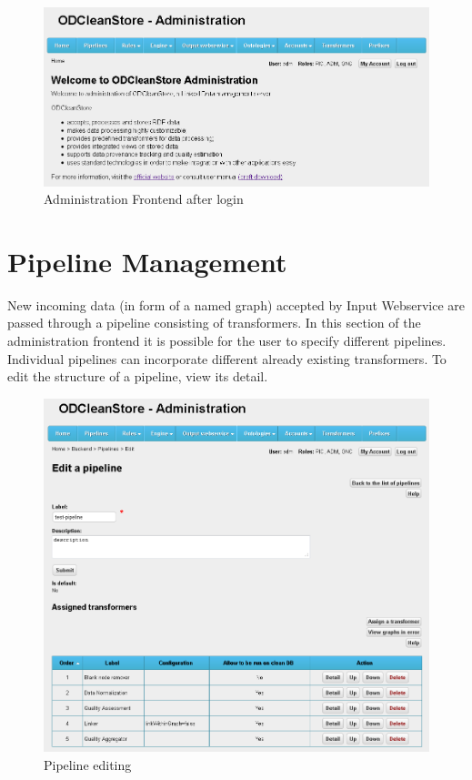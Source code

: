 \begin{figure}[tb]
    \centering
    \includegraphics[width=\textwidth]{images/fe-home-screenshot.png}
    \caption{Administration Frontend after login}
	\label{fig:feHome}
\end{figure}


\section{Pipeline Management}
\label{sec:pipelineManagement}

	New incoming data (in form of a named graph) accepted by Input Webservice are passed through a {pipeline} consisting of {transformers}. In this section of the administration frontend it is possible for the user to specify different {pipelines}. Individual {pipelines} can incorporate different already existing {transformers}. To edit the structure of a {pipeline}, view its detail.

\begin{figure}[tb]
    \centering
    \includegraphics[width=\textwidth]{images/fe-pipeline-screenshot.png}
    \caption{Pipeline editing}
	\label{fig:feHome}
\end{figure}

